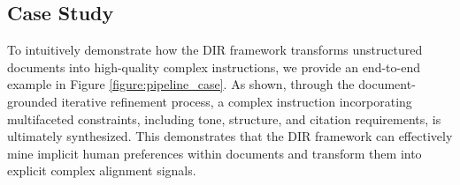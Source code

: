 


\subsection{Case Study}


To intuitively demonstrate how the DIR framework transforms unstructured documents into high-quality complex instructions, we provide an end-to-end example in Figure \ref{figure:pipeline_case}. As shown, through the document-grounded iterative refinement process, a complex instruction incorporating multifaceted constraints, including tone, structure, and citation requirements, is ultimately synthesized. This demonstrates that the DIR framework can effectively mine implicit human preferences within documents and transform them into explicit complex alignment signals.